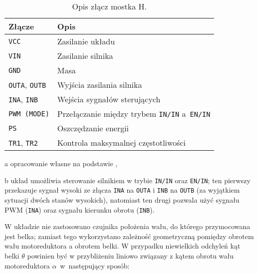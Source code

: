 
\begin{table}[H]
    \centering
    \begin{threeparttable}
        \caption{Opis złącz mostka H.}
        \label{tab:zlacza_mostka_H}
        
        \begin{tabularx}{0.67\textwidth}{l | l}
            \toprule
            Złącze & Opis \\
            \midrule
            \texttt{VCC} & Zasilanie układu \\
            \texttt{VIN} & Zasilanie silnika \\
            \texttt{GND} & Masa \\
            \texttt{OUTA}, \texttt{OUTB} & Wyjścia zasilania silnika \\
            \texttt{INA}, \texttt{INB} & Wejścia sygnałów sterujących \\
            \texttt{PWM (MODE)} & Przełączanie między trybem \texttt{IN/IN} a~\texttt{EN/IN}\tnote{b} \\
            \texttt{PS} & Oszczędzanie energii \\
            \texttt{TR1}, \texttt{TR2} & Kontrola maksymalnej częstotliwości \\
            \bottomrule
        \end{tabularx}
        
        \begin{tablenotes}
            \footnotesize
            \item[a] opracowanie własne na podstawie \cite{MOSTEK_H_MANUAL},
            \item[b] układ umożliwia sterowanie silnikiem w trybie \texttt{IN/IN} oraz \texttt{EN/IN}; ten pierwszy przekazuje sygnał wysoki ze złącza \texttt{INA} na \texttt{OUTA} i \texttt{INB} na \texttt{OUTB} (za wyjątkiem sytuacji dwóch stanów wysokich), natomiast ten drugi pozwala użyć sygnału PWM (\texttt{INA}) oraz sygnału kierunku obrotu (\texttt{INB}).
        \end{tablenotes}
    \end{threeparttable}
\end{table}

W układzie nie zastosowano czujnika położenia wału, do którego przymocowana jest belka; zamiast tego wykorzystano zależność geometryczną pomiędzy obrotem wału motoreduktora a obrotem belki. W przypadku niewielkich odchyleń kąt belki $\theta$ powinien być w przybliżeniu liniowo związany z kątem obrotu wału motoreduktora $\alpha$~w~następujący sposób:

